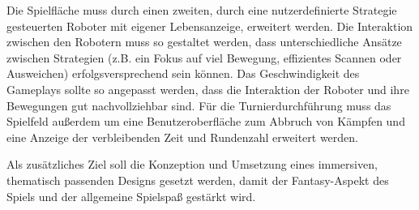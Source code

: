 Die Spielfläche muss durch einen zweiten, durch eine nutzerdefinierte Strategie gesteuerten Roboter
mit eigener Lebensanzeige, erweitert werden. Die Interaktion zwischen den Robotern muss so gestaltet
werden, dass unterschiedliche Ansätze zwischen Strategien (z.B. ein Fokus auf viel Bewegung,
effizientes Scannen oder Ausweichen) erfolgsversprechend sein können. Das Geschwindigkeit des
Gameplays sollte so angepasst werden, dass die Interaktion der Roboter und ihre Bewegungen gut
nachvollziehbar sind. Für die Turnierdurchführung muss das Spielfeld außerdem um eine
Benutzeroberfläche zum Abbruch von Kämpfen und eine Anzeige der verbleibenden Zeit und Rundenzahl
erweitert werden. 

Als zusätzliches Ziel soll die Konzeption und Umsetzung eines immersiven, thematisch passenden
Designs gesetzt werden, damit der Fantasy-Aspekt des Spiels und der allgemeine Spielspaß gestärkt
wird.
